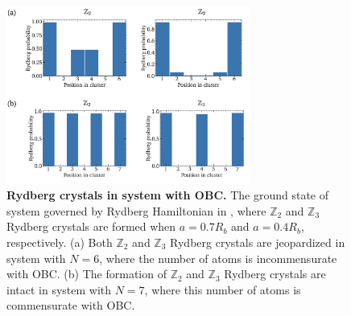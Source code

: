 \documentclass[%
 reprint,
nofootinbib,
 amsmath,amssymb,
 aps,
pra,
floatfix,
]{revtex4-2}
\begin{document}
\begin{figure}[ht!]
    \centering
    \includegraphics[width=8cm]{picture/Z2_Z3.png}
    \caption{\textbf{Rydberg crystals in system with OBC.} The ground state of system governed by Rydberg Hamiltonian in \cite{Bernien2017ProbingSimulator}, where $\mathbb{Z}_2$ and $\mathbb{Z}_3$ Rydberg crystals are formed when $a = 0.7R_b$ and $a = 0.4R_b$, respectively. (a) Both $\mathbb{Z}_2$ and $\mathbb{Z}_3$ Rydberg crystals are jeopardized in system with $N=6$, where the number of atoms is incommensurate with OBC. (b)  The formation of $\mathbb{Z}_2$ and $\mathbb{Z}_3$ Rydberg crystals are intact in system with $N=7$, where this number of atoms is commensurate with OBC. }
    \label{fig:Z2-Z3}
\end{figure}\\
\end{document}
